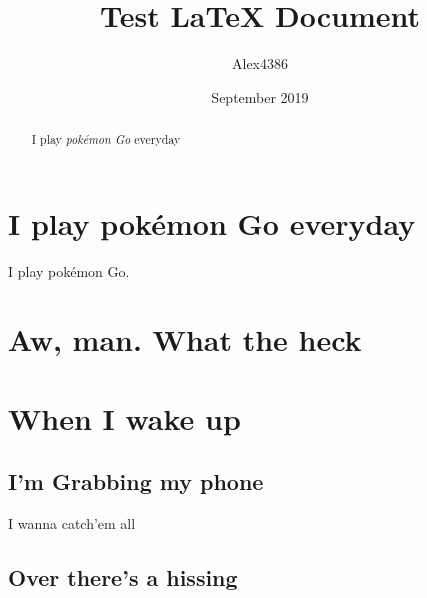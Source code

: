 \documentclass[12pt, letterpaper]{article}
\title{Test LaTeX Document}
\author{Alex4386}
\date{September 2019}
\begin{document}
\maketitle

\begin{abstract}
I play \emph{pokémon Go} everyday
\end{abstract}

\tableofcontents

\section{I play pokémon Go everyday}
I play pokémon Go.

\section*{Aw, man. What the heck}

\section{When I wake up}
\subsection{I'm Grabbing my phone}
I wanna catch'em all

\subsection*{Over there's a hissing}
\end{document}
